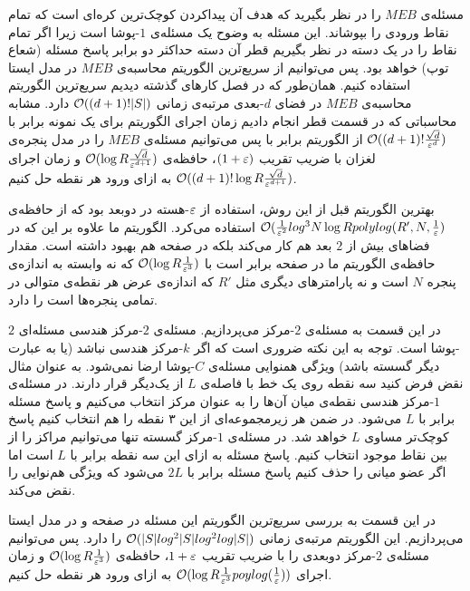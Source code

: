 مسئله‌ی $MEB$ را در نظر بگیرید که هدف آن پیدا‌کردن کوچک‌ترین کره‌ای است که تمام نقاط ورودی را بپوشاند. این مسئله به وضوح یک مسئله‌ی $1$-پوشا است زیرا اگر تمام نقاط را در یک دسته در نظر بگیریم قطر آن دسته حداکثر دو برابر پاسخ مسئله (شعاع توپ) خواهد بود. پس می‌توانیم از سریع‌ترین الگوریتم محاسبه‌ی $MEB$ در مدل ایستا استفاده کنیم. همان‌طور که در فصل کارهای گذشته دیدیم سریع‌ترین الگوریتم محاسبه‌ی $MEB$ در فضای $d$-بعدی  مرتبه‌ی زمانی
 $\mathcal{O}((d+1)! |S|)$
  دارد. مشابه محاسباتی که در قسمت قطر انجام دادیم زمان اجرای الگوریتم برای یک نمونه  برابر با 
$ \mathcal{O}((d+1)! \frac{\sqrt{d}}{\varepsilon^d})$
از الگوریتم برابر با پس می‌توانیم مسئله‌ی $MEB$ را در مدل پنجره‌ی لغزان با ضریب تقریب $(1+\varepsilon)$، حافظه‌ی 
$ \mathcal{O}(\log R \frac{\sqrt{d}}{\varepsilon^{d+1}})$
و زمان اجرای
$ \mathcal{O}((d+1)! \log R \frac{\sqrt{d}}{\varepsilon^{d+1}})$
به ازای ورود هر نقطه حل کنیم.

بهترین الگوریتم قبل از این روش، استفاده از $\varepsilon$-هسته در دوبعد بود  که از حافظه‌ی 
$ \mathcal{O}(\frac{1}{\varepsilon^2} log^3 N \log R polylog(R', N, \frac{1}{\varepsilon})$
استفاده می‌کرد. الگوریتم ما علاوه بر این که در فضاهای بیش از $2$ بعد هم کار می‌کند بلکه در صفحه هم بهبود داشته است. مقدار حافظه‌ی الگوریتم ما در صفحه برابر است با
$ \mathcal{O}(\log R \frac{1}{\varepsilon^3})$
که نه وابسته به اندازه‌ی پنجره $N$ است و نه پارامترهای دیگری مثل $R'$ که اندازه‌ی عرض هر نقطه‌ی متوالی در تمامی پنجره‌ها است را دارد.

در این قسمت به مسئله‌ی $2$-مرکز می‌پردازیم. مسئله‌ی $2$-مرکز  هندسی مسئله‌ای $2$-پوشا است.  توجه به این نکته ضروری است که اگر $k$-مرکز هندسی نباشد (یا به عبارت دیگر گسسته باشد) ویژگی همنوایی مسئله‌ی $C$-پوشا ارضا نمی‌شود. به عنوان مثال نقض فرض کنید سه نقطه روی یک خط با فاصله‌ی $L$ از یک‌دیگر قرار دارند. در مسئله‌ی $1$-مرکز هندسی   نقطه‌ی میان آن‌ها را به عنوان مرکز انتخاب می‌کنیم و پاسخ مسئله برابر با $L$ می‌شود.  در ضمن هر زیر‌مجموعه‌ای از این ۳ نقطه را هم انتخاب کنیم پاسخ کوچک‌تر مساوی $L$ خواهد شد. در مسئله‌ی $1$-مرکز گسسته تنها می‌توانیم مراکز را از بین نقاط موجود انتخاب کنیم. پاسخ مسئله به ازای این سه نقطه برابر با $L$ است اما اگر عضو میانی را حذف کنیم پاسخ مسئله برابر با $2L$ می‌شود که ویژگی هم‌نوایی را نقض می‌کند. 

در این قسمت به بررسی سریع‌ترین الگوریتم این مسئله در صفحه و در مدل ایستا می‌پردازیم. این الگوریتم مرتبه‌ی زمانی 
$ \mathcal{O}(|S| log^2 |S| log ^2 log |S|)$
را دارد. پس می‌توانیم مسئله‌ی $2$-مرکز دوبعدی را با ضریب تقریب $1+\varepsilon$، حافظه‌ی 
$ \mathcal{O}(\log R \frac{1}{\varepsilon^{3}})$
و زمان اجرای
$ \mathcal{O}(\log R \frac{1}{\varepsilon^3} poylog(\frac{1}{\varepsilon}))$
به ازای ورود هر نقطه حل کنیم.

